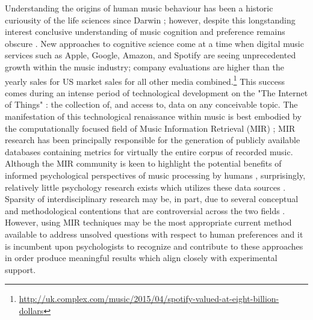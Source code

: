 \documentclass[a4paper]{article}
\begin{document}
Understanding the origins of human music behaviour has been a historic curiousity of the life sciences since Darwin \cite{darwin1871descent,darwin1883descent}; however, despite this longstanding interest conclusive understanding of music cognition and preference remains obscure \cite{pinker1999mind,mithen2006singing}. New approaches to cognitive science come at a time when digital music services such as Apple, Google, Amazon, and Spotify are seeing unprecedented growth within the music industry; company evaluations are higher than the yearly sales for US market sales for all other media combined.\footnote{\url{http://uk.complex.com/music/2015/04/spotify-valued-at-eight-billion-dollars}} This success comes during an intense period of technological development on the "The Internet of Things" \cite{ashton2009internet}: the collection of, and access to, data on any conceivable topic. The manifestation of this technological renaissance within music is best embodied by the computationally focused field of Music Information Retrieval (MIR) \cite{downie2003music}; MIR research has been principally responsible for the generation of publicly available databases containing metrics for virtually the entire corpus of recorded music. Although the MIR community is keen to highlight the potential benefits of informed psychological perspectives of music processing by humans \cite{downie2003music,casey2008content}, surprisingly, relatively little psychology research exists which utilizes these data sources \cite{aucouturier2013seven}. Sparsity of interdisciplinary research may be, in part, due to several conceptual and methodological contentions that are controversial across the two fields \cite{aucouturier2012mel}. However, using MIR techniques may be the most appropriate current method available to address unsolved questions with respect to human preferences and it is incumbent upon psychologists to recognize \cite{aucouturier2012mel,aucouturier2013seven} and contribute \cite{friberg2014using,siedenburg2016comparison} to these approaches in order produce meaningful results which align closely with experimental support.
\end{document}
